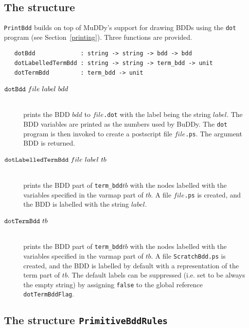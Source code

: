 \documentclass[12pt,fleqn]{article}
\renewcommand{\t}[1]{\mbox{\tt #1}}
\newcommand\termbddty{\texttt{term\_bdd}{}}
\newcommand{\Buddy}{BuDDy{}}
\newcommand{\Muddy}{MuDDy{}}
\begin{document}
\subsection{The structure }\label{PrintBdd}

\t{PrintBdd} builds on top of \Muddy's support for drawing BDDs using the \t{dot}
program (see Section~\ref{printing}). Three functions are provided.

\begin{verbatim}
   dotBdd             : string -> string -> bdd -> bdd
   dotLabelledTermBdd : string -> string -> term_bdd -> unit
   dotTermBdd         : term_bdd -> unit
\end{verbatim}

\begin{description}
\item[$\t{dotBdd}~file~label~bdd$]\mbox{}\\
prints the BDD $bdd$ to $file$\t{.dot} with
the label being the string $label$. The BDD variables are printed as the numbers used by \Buddy{}.
The \t{dot} program is then invoked to create 
a postscript file $file$\t{.ps}. The argument BDD is returned.

\item[$\t{dotLabelledTermBdd}~file~label~tb$]\mbox{}\\
prints the
BDD part of \termbddty $tb$ with the nodes labelled with
the variables specified in the varmap part of $tb$. A file $file$\t{.ps}
is created, and the BDD is labelled with the string $label$.


\item[$\t{dotTermBdd}~tb$]\mbox{}\\
prints the
BDD part of \termbddty $tb$ with the nodes labelled with
the variables specified in the varmap part of $tb$. A file \t{ScratchBdd.ps}
is created, and the BDD is labelled by default with a representation
of the term part of $tb$. The default labels
can be suppressed (i.e. set to be always the empty string) by assigning \t{false}
to the global reference \t{dotTermBddFlag}.
\end{description}

\subsection{The structure \t{PrimitiveBddRules}}\label{PrimitiveBddRules}
\end{document}
